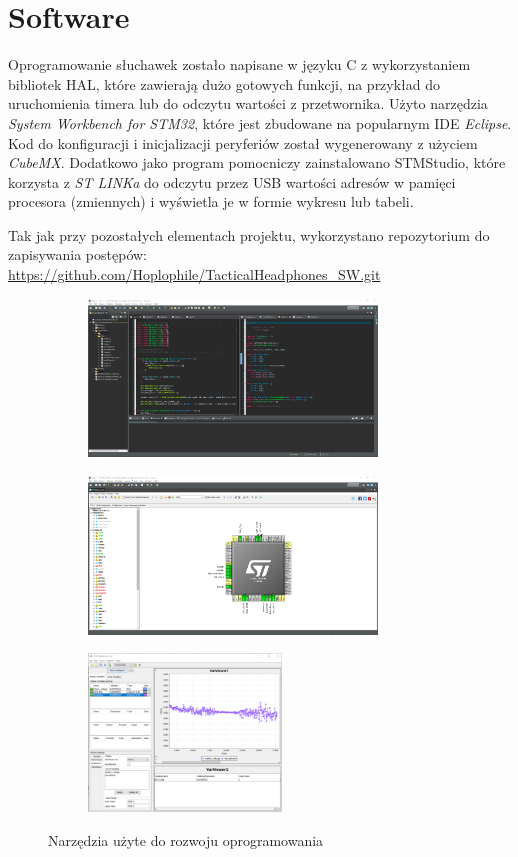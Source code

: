 \chapter{Software}
\label{cha:software}

Oprogramowanie słuchawek zostało napisane w języku C z wykorzystaniem bibliotek HAL, które zawierają dużo gotowych funkcji, na przykład do uruchomienia timera lub do odczytu wartości z przetwornika. Użyto narzędzia \textit{System Workbench for STM32}, które jest zbudowane na popularnym IDE \textit{Eclipse}. Kod do konfiguracji i inicjalizacji peryferiów został wygenerowany z użyciem \textit{CubeMX}. Dodatkowo jako program pomocniczy zainstalowano STMStudio, które korzysta z \textit{ST LINKa} do odczytu przez USB wartości adresów w pamięci procesora (zmiennych) i wyświetla je w formie wykresu lub tabeli.

Tak jak przy pozostałych elementach projektu, wykorzystano repozytorium do zapisywania postępów: \url{https://github.com/Hoplophile/TacticalHeadphones_SW.git}

\begin{figure}[H]
	\centering
	\begin{subfigure}{.48\textwidth}
		\centering
		\includegraphics[height=4.2cm]{zdjecia/eclipse.png}
	\end{subfigure}
	\begin{subfigure}{.48\textwidth}
		\centering
		\includegraphics[height=4.2cm]{zdjecia/cubemx.png}
	\end{subfigure}
	\begin{subfigure}{.48\textwidth}
	\centering
	\includegraphics[height=4.2cm]{zdjecia/stmstudio.png}
	\end{subfigure}
	\caption{\label{pic:IDE} Narzędzia użyte do rozwoju oprogramowania}
\end{figure}

